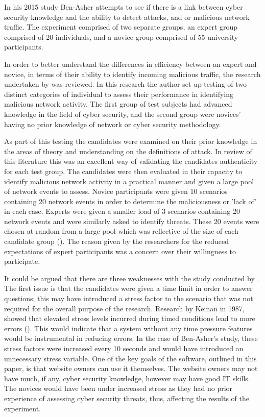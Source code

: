 In his 2015 study Ben-Asher attempts to see if there is a link between cyber security knowledge and the ability to detect attacks, and or malicious network traffic. The experiment comprised of two separate groups, an expert group comprised of 20 individuals, and a novice group comprised of 55 university participants. 

In order to better understand the differences in efficiency between an expert and novice, in terms of their ability to identify incoming malicious traffic, the research undertaken by \citeauthor{ben2015effects} was reviewed. In this research the author set up testing of two distinct categories of individual to assess their performance in identifying malicious network activity. The first group of test subjects had advanced knowledge in the field of cyber security, and the second group were novices' having no prior knowledge of network or cyber security methodology. 

As part of this testing the candidates were examined on their prior knowledge in the areas of theory and understanding on the definitions of attack. In review of this literature this was an excellent way of validating the candidates authenticity for each test group. The candidates were then evaluated in their capacity to identify malicious network activity in a practical manner and given a large pool of network events to assess. Novice participants were given 10 scenarios containing 20 network events in order to determine the maliciousness or 'lack of' in each case. Experts were given a smaller load of 3 scenarios containing 20 network events and were similarly asked to identify threats. These 20 events were chosen at random from a large pool which was reflective of the size of each candidate group (\cite{ben2015effects}). The reason given by the researchers for the reduced expectations of expert participants was a concern over their willingness to participate.

It could be argued that there are three weaknesses with the study conducted by \citeauthor{ben2015effects}. The first issue is that the candidates were given a time limit in order to answer questions; this may have introduced a stress factor to the scenario that was not required for the overall purpose of the research. Research by Keinan in 1987, showed that elevated stress levels incurred during timed conditions lead to more errors (\cite{Keinan}). This would indicate that a system without any time pressure features would be instrumental in reducing errors. In the case of Ben-Asher's study, these stress factors were increased every 10 seconds and would have introduced an unnecessary stress variable. One of the key goals of the software, outlined in this paper, is that website owners can use it themselves. The website owners may not have much, if any, cyber security knowledge, however may have good IT skills. The novices would have been under increased stress as they had no prior experience of assessing cyber security threats, thus, affecting the results of the experiment.

